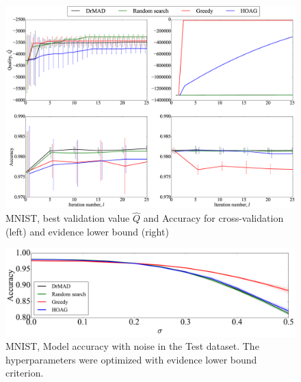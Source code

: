     \begin{figure}

    \includegraphics[width=0.5\linewidth]{plots/hyperparams/Fig_mnist.eps}

    \caption{MNIST, best validation value  $\hat{Q}$ and Accuracy  for cross-validation (left) and evidence lower bound (right)}
    \label{fig:mnist}
    \end{figure}

    \begin{figure}

    \includegraphics[width=0.5\linewidth]{plots/hyperparams/Fig_noise.pdf}

    \caption{MNIST, Model accuracy with noise in the Test dataset. The hyperparameters were optimized with evidence lower bound criterion.}
    \label{fig:noise}
    \end{figure}






